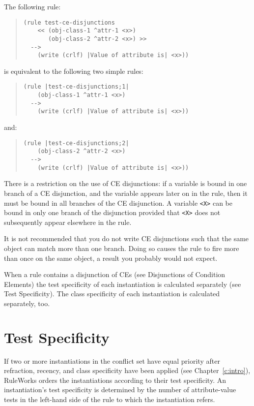 The following rule:
\begin{quote}
\begin{verbatim}
(rule test-ce-disjunctions
    << (obj-class-1 ^attr-1 <x>)
       (obj-class-2 ^attr-2 <x>) >>
  -->
    (write (crlf) |Value of attribute is| <x>))
\end{verbatim}
\end{quote}
is equivalent to the following two simple rules:
\begin{quote}
\begin{verbatim}
(rule |test-ce-disjunctions;1|
    (obj-class-1 ^attr-1 <x>)
  -->
    (write (crlf) |Value of attribute is| <x>))
\end{verbatim}
\end{quote}
and:
\begin{quote}
\begin{verbatim}
(rule |test-ce-disjunctions;2|
    (obj-class-2 ^attr-2 <x>)
  -->
    (write (crlf) |Value of attribute is| <x>))
\end{verbatim}
\end{quote}
There is a restriction on the use of CE disjunctions: if a variable is
bound in one branch of a CE disjunction, and the variable appears
later on in the rule, then it must be bound in all branches of the CE
disjunction. A variable \verb|<X>| can be bound in only one branch of
the disjunction provided that \verb|<X>| does not subsequently appear
elsewhere in the rule.

It is not recommended that you do not write CE disjunctions such that
the same object can match more than one branch. Doing so causes the
rule to fire more than once on the same object, a result you probably
would not expect.

When a rule contains a disjunction of CEs (see Disjunctions of
Condition Elements) the test specificity of each instantiation is
calculated separately (see Test Specificity). The class specificity of
each instantiation is calculated separately, too.

\section{Test Specificity}

If two or more instantiations in the conflict set have equal priority
after refraction, recency, and class specificity have been applied
(see Chapter~\ref{c:intro}), RuleWorks orders the instantiations
according to their test specificity. An instantiation's test
specificity is determined by the number of attribute-value tests in
the left-hand side of the rule to which the instantiation refers.

